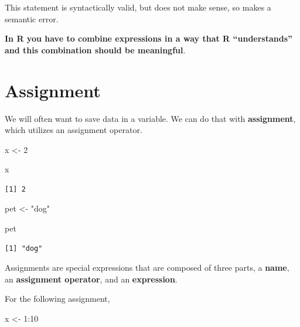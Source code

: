 \documentclass[
]{book}
\newenvironment{Shaded}{\begin{snugshade}}{\end{snugshade}}
\newcommand{\DecValTok}[1]{\textcolor[rgb]{0.00,0.00,0.81}{#1}}
\newcommand{\NormalTok}[1]{#1}
\newcommand{\OtherTok}[1]{\textcolor[rgb]{0.56,0.35,0.01}{#1}}
\newcommand{\SpecialCharTok}[1]{\textcolor[rgb]{0.00,0.00,0.00}{#1}}
\newcommand{\StringTok}[1]{\textcolor[rgb]{0.31,0.60,0.02}{#1}}
\begin{document}
This statement is syntactically valid, but does not make sense, so makes a semantic error.

\textbf{In R you have to combine expressions in a way that R ``understands'' and this combination should be meaningful}.

\hypertarget{assignment}{%
\section{Assignment}\label{assignment}}

We will often want to save data in a variable. We can do that with \textbf{assignment}, which utilizes an assignment operator.

\begin{Shaded}
\begin{Highlighting}[]
\NormalTok{x }\OtherTok{\textless{}{-}} \DecValTok{2}
\end{Highlighting}
\end{Shaded}

\begin{Shaded}
\begin{Highlighting}[]
\NormalTok{x}
\end{Highlighting}
\end{Shaded}

\begin{verbatim}
[1] 2
\end{verbatim}

\begin{Shaded}
\begin{Highlighting}[]
\NormalTok{pet }\OtherTok{\textless{}{-}} \StringTok{"dog"}
\end{Highlighting}
\end{Shaded}

\begin{Shaded}
\begin{Highlighting}[]
\NormalTok{pet}
\end{Highlighting}
\end{Shaded}

\begin{verbatim}
[1] "dog"
\end{verbatim}

Assignments are special expressions that are composed of three parts, a \textbf{name}, an \textbf{assignment operator}, and an \textbf{expression}.

For the following assignment,

\begin{Shaded}
\begin{Highlighting}[]
\NormalTok{x }\OtherTok{\textless{}{-}} \DecValTok{1}\SpecialCharTok{:}\DecValTok{10}
\end{Highlighting}
\end{Shaded}
\end{document}
